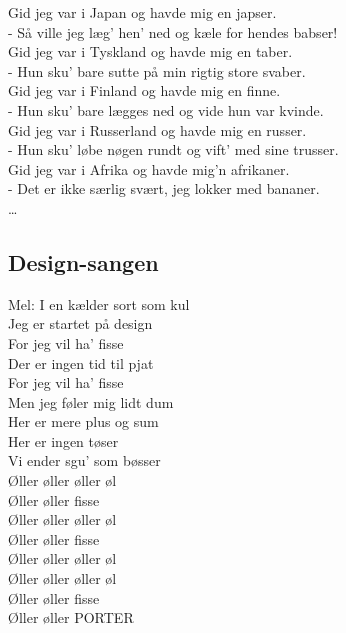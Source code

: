 Gid jeg var i Japan og havde mig en japser.\\
- Så ville jeg læg' hen' ned og kæle for hendes babser!\\

Gid jeg var i Tyskland og havde mig en taber.\\
- Hun sku’ bare sutte på min rigtig store svaber.\\

Gid jeg var i Finland og havde mig en finne.\\
- Hun sku’ bare lægges ned og vide hun var kvinde.\\

Gid jeg var i Russerland og havde mig en russer.\\
- Hun sku’ løbe nøgen rundt og vift’ med sine trusser.\\

Gid jeg var i Afrika og havde mig’n afrikaner.\\
- Det er ikke særlig svært, jeg lokker med bananer.\\

…\\

\subsection*{Design-sangen}

Mel: I en kælder sort som kul\\

Jeg er startet på design\\
For jeg vil ha’ fisse\\
Der er ingen tid til pjat\\
For jeg vil ha’ fisse\\
Men jeg føler mig lidt dum\\
Her er mere plus og sum\\
Her er ingen tøser\\
Vi ender sgu’ som bøsser\\

Øller øller øller øl\\
Øller øller fisse\\
Øller øller øller øl\\
Øller øller fisse\\
Øller øller øller øl\\
Øller øller øller øl\\
Øller øller fisse\\
Øller øller PORTER\\

